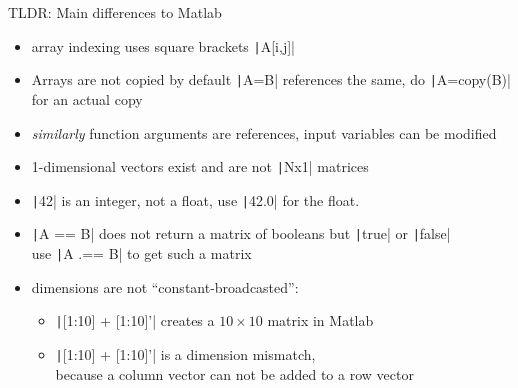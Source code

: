 \documentclass[aspectratio=169, 12pt]{beamer}
\begin{document}
    \begin{frame}[fragile]{TLDR: Main differences to Matlab}
        \begin{itemize}
            \item array indexing uses square brackets \texttt|A[i,j]|
            \item Arrays are not copied by default \texttt|A=B| references the same, do \texttt|A=copy(B)| for an actual copy
            \item \emph{similarly} function arguments are references, \alert{input variables can be modified}
            \item 1-dimensional vectors exist and are not \texttt|Nx1| matrices
            \item \texttt|42| is an integer, not a float, use \texttt|42.0| for the float.
            \item \texttt|A == B| does not return a matrix of booleans but \texttt|true| or \texttt|false|\\
            use \texttt|A .== B| to get such a matrix
            \item dimensions are not “constant-broadcasted”:\\
            \begin{itemize}
                \item \texttt|[1:10] + [1:10]'| creates a $10\times 10$ matrix in Matlab
                \item \texttt|[1:10] + [1:10]'| is a dimension mismatch,\\
                 because a column vector can not be added to a row vector
            \end{itemize}
        \end{itemize}
    \end{frame}
\end{document}

